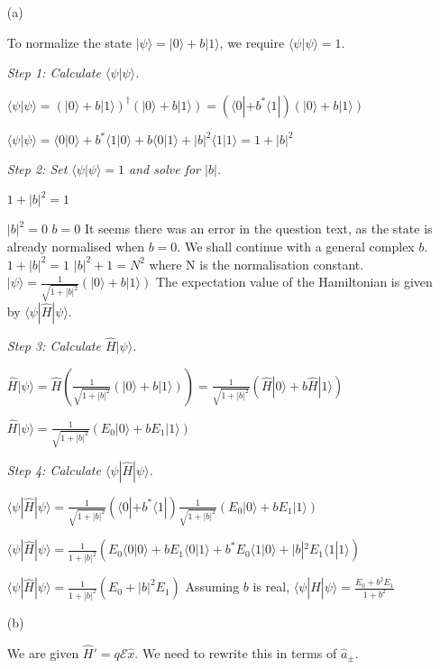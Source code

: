 \documentclass{article}
\begin{document}
\begin{enumerate}
\item[(a)]

To normalize the state $|\psi\rangle = |0\rangle + b|1\rangle$, we require $\langle\psi|\psi\rangle = 1$.

\textit{Step 1: Calculate $\langle\psi|\psi\rangle$.}

$\langle\psi|\psi\rangle = (|0\rangle + b|1\rangle)^\dagger (|0\rangle + b|1\rangle) = (\langle 0| + b^*\langle 1|)(|0\rangle + b|1\rangle)$

$\langle\psi|\psi\rangle = \langle 0|0\rangle + b^*\langle 1|0\rangle + b\langle 0|1\rangle + |b|^2\langle 1|1\rangle = 1 + |b|^2$

\textit{Step 2: Set $\langle\psi|\psi\rangle = 1$ and solve for $|b|$.}

$1 + |b|^2 = 1$

$|b|^2 = 0$
$b=0$
It seems there was an error in the question text, as the state is already normalised when \(b=0\). We shall continue with a general complex \(b\).
$1 + |b|^2 = 1$
$|b|^2 + 1 = N^2$ where N is the normalisation constant.
$|\psi\rangle = \frac{1}{\sqrt{1+|b|^2}} (|0\rangle + b|1\rangle)$
The expectation value of the Hamiltonian is given by $\langle\psi|\hat{H}|\psi\rangle$.

\textit{Step 3: Calculate $\hat{H}|\psi\rangle$.}

$\hat{H}|\psi\rangle = \hat{H} \left( \frac{1}{\sqrt{1+|b|^2}} (|0\rangle + b|1\rangle) \right) = \frac{1}{\sqrt{1+|b|^2}}(\hat{H}|0\rangle + b\hat{H}|1\rangle)$

$\hat{H}|\psi\rangle = \frac{1}{\sqrt{1+|b|^2}}(E_0|0\rangle + bE_1|1\rangle)$

\textit{Step 4: Calculate $\langle\psi|\hat{H}|\psi\rangle$.}

$\langle\psi|\hat{H}|\psi\rangle = \frac{1}{\sqrt{1+|b|^2}}(\langle 0| + b^*\langle 1|)\frac{1}{\sqrt{1+|b|^2}}(E_0|0\rangle + bE_1|1\rangle)$

$\langle\psi|\hat{H}|\psi\rangle = \frac{1}{1+|b|^2}(E_0\langle 0|0\rangle + bE_1\langle 0|1\rangle + b^*E_0\langle 1|0\rangle + |b|^2E_1\langle 1|1\rangle)$

$\langle\psi|\hat{H}|\psi\rangle = \frac{1}{1+|b|^2}(E_0 + |b|^2E_1)$
Assuming $b$ is real,
$\langle\psi|\hat{H}|\psi\rangle = \frac{E_0 + b^2E_1}{1+b^2}$

\item[(b)]

We are given $\hat{H}' = q\mathcal{E}\hat{x}$. We need to rewrite this in terms of $\hat{a}_\pm$.


\end{enumerate}
\end{document}
